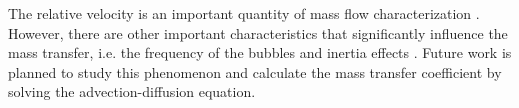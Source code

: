 \documentclass[preprint,12pt]{elsarticle}
\begin{document}
The relative velocity is an important quantity of mass flow characterization
\cite{kreutzer-taylor,yue-mass}. However, there are other important characteristics that
significantly influence the mass transfer, i.e. the frequency of the bubbles \cite{kreutzer-taylor}
and 
inertia effects \cite{heil-bretherton}. 
Future work is planned to study this phenomenon and calculate the mass transfer coefficient by
solving the advection-diffusion equation.

\end{document}
